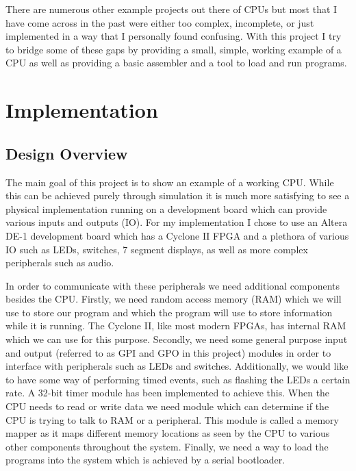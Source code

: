 \documentclass[10pt]{article}
\begin{document}
There are numerous other example projects out there of CPUs but most that I
have come across in the past were either too complex, incomplete, or just
implemented in a way that I personally found confusing.  With this project I
try to bridge some of these gaps by providing a small, simple, working example
of a CPU as well as providing a basic assembler and a tool to load and run
programs.

\newpage
\section{Implementation}

    \subsection{Design Overview}

    The main goal of this project is to show an example of a working CPU. While
    this can be achieved purely through simulation it is much more satisfying
    to see a physical implementation running on a development board which can
    provide various inputs and outputs (IO).  For my implementation I chose to
    use an Altera DE-1 development board which has a Cyclone II FPGA and a
    plethora of various IO such as LEDs, switches, 7 segment displays, as well
    as more complex peripherals such as audio.

    In order to communicate with these peripherals we need additional
    components besides the CPU. Firstly, we need random access memory (RAM)
    which we will use to store our program and which the program will use to
    store information while it is running. The Cyclone II, like most modern
    FPGAs, has internal RAM which we can use for this purpose.  Secondly, we
    need some general purpose input and output (referred to as GPI and GPO in
    this project) modules in order to interface with peripherals such as LEDs
    and switches. Additionally, we would like to have some way of performing
    timed events, such as flashing the LEDs a certain rate. A 32-bit timer
    module has been implemented to achieve this. When the CPU needs to read or
    write data we need module which can determine if the CPU is trying to talk
    to RAM or a peripheral. This module is called a memory mapper as it maps
    different memory locations as seen by the CPU to various other components
    throughout the system. Finally, we need a way to load the programs into the
    system which is achieved by a serial bootloader.
\end{document}
